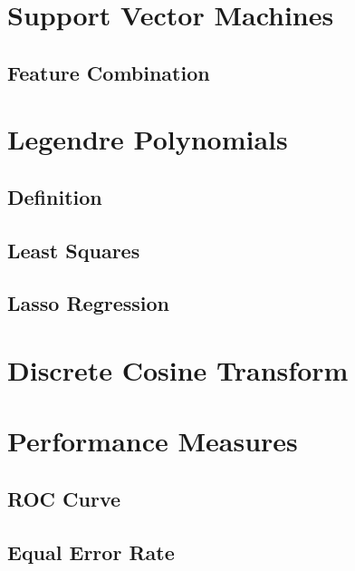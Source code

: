 \documentclass[11pt,a4paper]{tesis}
\begin{document}
	\section{Support Vector Machines}
		
		\subsection{Feature Combination}
	\section{Legendre Polynomials}
		\subsection{Definition}
		\subsection{Least Squares}
		\subsection{Lasso Regression}
	\section{Discrete Cosine Transform}
	\section{Performance Measures}
		\subsection{ROC Curve}
		\subsection{Equal Error Rate}
			
\end{document}
